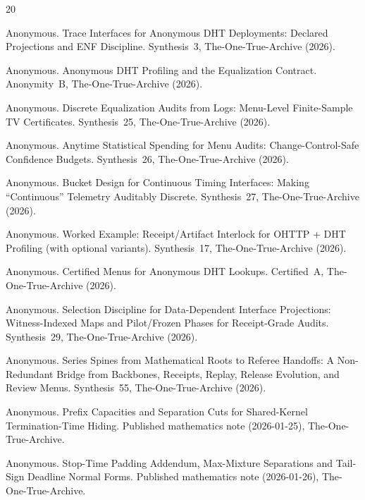 \documentclass[11pt]{article}
\begin{document}

\begin{thebibliography}{20}

Anonymous.
\newblock Trace Interfaces for Anonymous DHT Deployments: Declared Projections and ENF Discipline.
\newblock Synthesis~3, The-One-True-Archive (2026).

Anonymous.
\newblock Anonymous DHT Profiling and the Equalization Contract.
\newblock Anonymity~B, The-One-True-Archive (2026).

Anonymous.
\newblock Discrete Equalization Audits from Logs: Menu-Level Finite-Sample TV Certificates.
\newblock Synthesis~25, The-One-True-Archive (2026).

Anonymous.
\newblock Anytime Statistical Spending for Menu Audits: Change-Control-Safe Confidence Budgets.
\newblock Synthesis~26, The-One-True-Archive (2026).

Anonymous.
\newblock Bucket Design for Continuous Timing Interfaces: Making ``Continuous'' Telemetry Auditably Discrete.
\newblock Synthesis~27, The-One-True-Archive (2026).


Anonymous.
\newblock Worked Example: Receipt/Artifact Interlock for OHTTP + DHT Profiling (with optional variants).
\newblock Synthesis~17, The-One-True-Archive (2026).

Anonymous.
\newblock Certified Menus for Anonymous DHT Lookups.
\newblock Certified~A, The-One-True-Archive (2026).

Anonymous.
\newblock Selection Discipline for Data-Dependent Interface Projections: Witness-Indexed Maps and Pilot/Frozen Phases for Receipt-Grade Audits.
\newblock Synthesis~29, The-One-True-Archive (2026).

Anonymous.
\newblock Series Spines from Mathematical Roots to Referee Handoffs: A Non-Redundant Bridge from Backbones, Receipts, Replay, Release Evolution, and Review Menus.
\newblock Synthesis~55, The-One-True-Archive (2026).

Anonymous.
\newblock Prefix Capacities and Separation Cuts for Shared-Kernel Termination-Time Hiding.
\newblock Published mathematics note (2026-01-25), The-One-True-Archive.

Anonymous.
\newblock Stop-Time Padding Addendum, Max-Mixture Separations and Tail-Sign Deadline Normal Forms.
\newblock Published mathematics note (2026-01-26), The-One-True-Archive.

\end{thebibliography}
\end{document}
